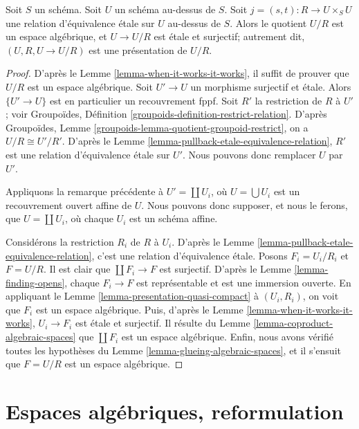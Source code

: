 \begin{theorem}
\label{theorem-presentation}
Soit $S$ un schéma. Soit $U$ un schéma au-dessus de $S$.
Soit $j = (s, t) : R \to U \times_S U$
une relation d'équivalence \'etale sur $U$ au-dessus de $S$.
Alors le quotient $U/R$ est un espace algébrique,
et $U \to U/R$ est \'etale et surjectif; autrement dit,
$(U, R, U \to U/R)$ est une présentation de $U/R$.
\end{theorem}

\begin{proof}
D'après le Lemme \ref{lemma-when-it-works-it-works},
il suffit de prouver que $U/R$ est un espace algébrique.
Soit $U' \to U$ un morphisme surjectif et \'etale.
Alors $\{U' \to U\}$ est en particulier un recouvrement fppf.
Soit $R'$ la restriction de $R$ à $U'$; voir
Groupoïdes, Définition \ref{groupoids-definition-restrict-relation}.
D'après
Groupoïdes, Lemme \ref{groupoids-lemma-quotient-groupoid-restrict},
on a $U/R \cong U'/R'$.
D'après le Lemme \ref{lemma-pullback-etale-equivalence-relation}, $R'$ est une
relation d'équivalence \'etale sur $U'$. Nous pouvons donc remplacer $U$ par $U'$.

\medskip\noindent
Appliquons la remarque précédente à $U' = \coprod U_i$, où
$U = \bigcup U_i$ est un recouvrement ouvert affine de $U$. Nous
pouvons donc supposer, et nous le ferons, que $U = \coprod U_i$, où
chaque $U_i$ est un schéma affine.

\medskip\noindent
Considérons la restriction $R_i$ de $R$ à $U_i$.
D'après le Lemme \ref{lemma-pullback-etale-equivalence-relation},
c'est une relation d'équivalence \'etale.
Posons $F_i = U_i/R_i$ et $F = U/R$.
Il est clair que $\coprod F_i \to F$ est surjectif.
D'après le Lemme \ref{lemma-finding-opens}, chaque $F_i \to F$
est représentable et est une immersion ouverte.
En appliquant le Lemme \ref{lemma-presentation-quasi-compact}
à $(U_i, R_i)$, on voit que $F_i$ est un espace algébrique.
Puis, d'après le Lemme \ref{lemma-when-it-works-it-works},
$U_i \to F_i$ est \'etale et surjectif.
Il résulte du Lemme \ref{lemma-coproduct-algebraic-spaces}
que $\coprod F_i$ est un espace algébrique.
Enfin, nous avons vérifié toutes les
hypothèses du Lemme \ref{lemma-glueing-algebraic-spaces},
et il s'ensuit que $F = U/R$ est un espace algébrique.
\end{proof}










\section{Espaces algébriques, reformulation}
\label{section-algebraic-spaces-retrofitted}

